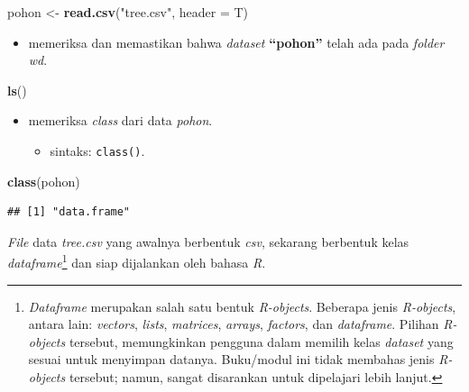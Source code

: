 \documentclass[
  12pt,
  a4paper,
]{scrbook}
\newenvironment{Shaded}{\begin{snugshade}}{\end{snugshade}}
\newcommand{\DataTypeTok}[1]{\textcolor[rgb]{0.13,0.29,0.53}{#1}}
\newcommand{\KeywordTok}[1]{\textcolor[rgb]{0.13,0.29,0.53}{\textbf{#1}}}
\newcommand{\NormalTok}[1]{#1}
\newcommand{\StringTok}[1]{\textcolor[rgb]{0.31,0.60,0.02}{#1}}
\providecommand{\tightlist}{%
  \setlength{\itemsep}{0pt}\setlength{\parskip}{0pt}}
\begin{document}
\begin{Shaded}
\begin{Highlighting}[]
\NormalTok{pohon <-}\StringTok{ }\KeywordTok{read.csv}\NormalTok{(}\StringTok{"tree.csv"}\NormalTok{, }\DataTypeTok{header =}\NormalTok{ T)}
\end{Highlighting}
\end{Shaded}

\begin{itemize}
\tightlist
\item
  memeriksa dan memastikan bahwa \emph{dataset} \textbf{``pohon''} telah
  ada pada \emph{folder wd}.
\end{itemize}

\begin{Shaded}
\begin{Highlighting}[]
\KeywordTok{ls}\NormalTok{()}
\end{Highlighting}
\end{Shaded}

\begin{itemize}
\tightlist
\item
  memeriksa \emph{class} dari data \emph{pohon}.

  \begin{itemize}
  \tightlist
  \item
    sintaks: \texttt{class()}.
  \end{itemize}
\end{itemize}

\begin{Shaded}
\begin{Highlighting}[]
\KeywordTok{class}\NormalTok{(pohon)}
\end{Highlighting}
\end{Shaded}

\begin{verbatim}
## [1] "data.frame"
\end{verbatim}

\emph{File} data \emph{tree.csv} yang awalnya berbentuk \emph{csv},
sekarang berbentuk kelas \emph{dataframe}\footnote{\emph{Dataframe}
  merupakan salah satu bentuk \emph{R-objects}. Beberapa jenis
  \emph{R-objects}, antara lain: \emph{vectors}, \emph{lists},
  \emph{matrices}, \emph{arrays}, \emph{factors}, dan \emph{dataframe}.
  Pilihan \emph{R-objects} tersebut, memungkinkan pengguna dalam memilih
  kelas \emph{dataset} yang sesuai untuk menyimpan datanya. Buku/modul
  ini tidak membahas jenis \emph{R-objects} tersebut; namun, sangat
  disarankan untuk dipelajari lebih lanjut.} dan siap dijalankan oleh
bahasa \emph{R}.
\end{document}
